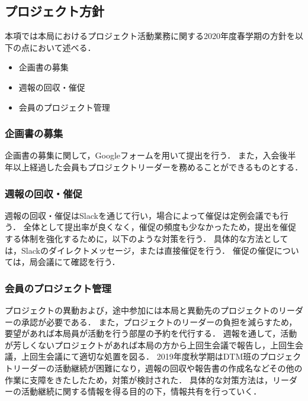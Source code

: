﻿\subsection*{プロジェクト方針}


本項では本局におけるプロジェクト活動業務に関する2020年度春学期の方針を以下の点において述べる．

\begin{itemize}
\item 企画書の募集
\item 週報の回収・催促
\item 会員のプロジェクト管理
\end{itemize}

\subsubsection*{企画書の募集}

企画書の募集に関して，Googleフォームを用いて提出を行う．
また，入会後半年以上経過した会員もプロジェクトリーダーを務めることができるものとする．


\subsubsection*{週報の回収・催促}

週報の回収・催促はSlackを通じて行い，場合によって催促は定例会議でも行う．
全体として提出率が良くなく，催促の頻度も少なかったため，提出を催促する体制を強化するために，以下のような対策を行う．
具体的な方法としては，Slackのダイレクトメッセージ，または直接催促を行う．
催促の催促については，局会議にて確認を行う．

\subsubsection*{会員のプロジェクト管理}

プロジェクトの異動および，途中参加には本局と異動先のプロジェクトのリーダーの承認が必要である．
また，プロジェクトのリーダーの負担を減らすため，要望があれば本局員が活動を行う部屋の予約を代行する．
週報を通して，活動が芳しくないプロジェクトがあれば本局の方から上回生会議で報告し，上回生会議，上回生会議にて適切な処置を図る．
2019年度秋学期はDTM班のプロジェクトリーダーの活動継続が困難になり，週報の回収や報告書の作成名などその他の作業に支障をきたしたため，対策が検討された．
具体的な対策方法は，リーダーの活動継続に関する情報を得る目的の下，情報共有を行っていく．

